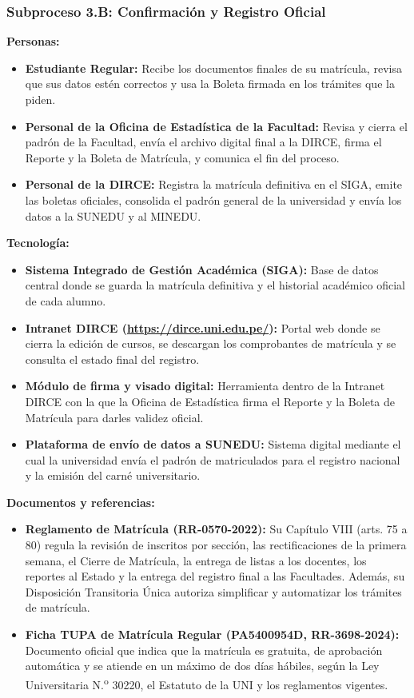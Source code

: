 \subsubsection{Subproceso 3.B: Confirmación y Registro Oficial}

\textbf{Personas:}
\begin{itemize}
    \item \textbf{Estudiante Regular:} Recibe los documentos finales de su matrícula, revisa que sus datos estén correctos y usa la Boleta firmada en los trámites que la piden.
    \item \textbf{Personal de la Oficina de Estadística de la Facultad:} Revisa y cierra el padrón de la Facultad, envía el archivo digital final a la DIRCE, firma el Reporte y la Boleta de Matrícula, y comunica el fin del proceso.
    \item \textbf{Personal de la DIRCE:} Registra la matrícula definitiva en el SIGA, emite las boletas oficiales, consolida el padrón general de la universidad y envía los datos a la SUNEDU y al MINEDU.
\end{itemize}

\textbf{Tecnología:}
\begin{itemize}
    \item \textbf{Sistema Integrado de Gestión Académica (SIGA):} Base de datos central donde se guarda la matrícula definitiva y el historial académico oficial de cada alumno.
    \item \textbf{Intranet DIRCE (\url{https://dirce.uni.edu.pe/}):} Portal web donde se cierra la edición de cursos, se descargan los comprobantes de matrícula y se consulta el estado final del registro.
    \item \textbf{Módulo de firma y visado digital:} Herramienta dentro de la Intranet DIRCE con la que la Oficina de Estadística firma el Reporte y la Boleta de Matrícula para darles validez oficial.
    \item \textbf{Plataforma de envío de datos a SUNEDU:} Sistema digital mediante el cual la universidad envía el padrón de matriculados para el registro nacional y la emisión del carné universitario.
\end{itemize}

\textbf{Documentos y referencias:}
\begin{itemize}
    \item \textbf{Reglamento de Matrícula (RR-0570-2022):} Su Capítulo VIII (arts. 75\textdegree{} a 80\textdegree{}) regula la revisión de inscritos por sección, las rectificaciones de la primera semana, el Cierre de Matrícula, la entrega de listas a los docentes, los reportes al Estado y la entrega del registro final a las Facultades. Además, su Disposición Transitoria Única autoriza simplificar y automatizar los trámites de matrícula.
    \item \textbf{Ficha TUPA de Matrícula Regular (PA5400954D, RR-3698-2024):} Documento oficial que indica que la matrícula es gratuita, de aprobación automática y se atiende en un máximo de dos días hábiles, según la Ley Universitaria N.\textsuperscript{o} 30220, el Estatuto de la UNI y los reglamentos vigentes.
\end{itemize}
